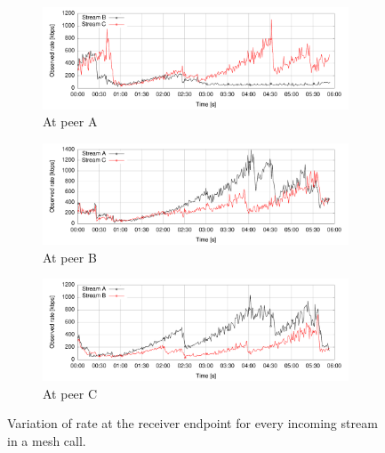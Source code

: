 \begin{figure}[h]
        \centering
        \begin{subfigure}[b]{1\textwidth}
                \centering
                \includegraphics[width=\textwidth]{./figures/nodeA.pdf}
                \caption{At peer A}
                \label{fig:meshA}
        \end{subfigure}
        
        \begin{subfigure}[b]{1\textwidth}
                \centering
                \includegraphics[width=\textwidth]{./figures/nodeB.pdf}
                \caption{At peer B}
                \label{fig:meshB}
        \end{subfigure} 
               
        \begin{subfigure}[b]{1\textwidth}
                \centering
                \includegraphics[width=\textwidth]{./figures/nodeC.pdf}
                \caption{At peer C}
                \label{fig:meshC}
        \end{subfigure}
        \caption[Variation of rate at the receiver endpoint for every incoming stream in a mesh call]{Variation of rate at the receiver endpoint for every incoming stream in a mesh call.}
        \label{fig:meshNoTurn}
\end{figure}

